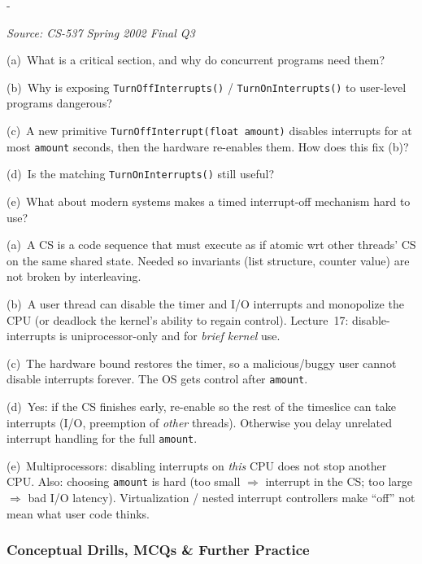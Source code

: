 \documentclass[11pt,a4paper]{article}
\makeatletter
\newcommand{\keepspace}[1]{\par\penalty-100\begingroup
  \setlength{\dimen@}{#1}\dimen@ii\pagegoal\advance\dimen@ii-\pagetotal
  \ifdim\dimen@>\dimen@ii\ifdim\dimen@ii>\z@\vfil\fi\break\fi\endgroup}
\newcounter{qn}[section]
\newenvironment{Qn}[4]{%
  \refstepcounter{qn}\keepspace{7\baselineskip}%
  \begin{tcolorbox}[qboxstyle, title={Q\thesection.\theqn\ \ [#1 \textbar\ #2]\ \ #4}]%
  {\footnotesize\color{g3}\textit{Source: #3}}\par\smallskip%
}{%
  \end{tcolorbox}%
}
\newenvironment{Sol}{%
  \begin{tcolorbox}[sboxstyle, title={Solution}]%
}{%
  \end{tcolorbox}\vspace{0.35em}%
}
\makeatother
\begin{document}
\begin{Qn}{Medium-Hard}{Lect 17}{CS-537 Spring 2002 Final Q3}{Turning interrupts off as a lock}
(a)~What is a critical section, and why do concurrent programs need them?

(b)~Why is exposing \texttt{TurnOffInterrupts()} / \texttt{TurnOnInterrupts()} to user-level programs dangerous?

(c)~A new primitive \texttt{TurnOffInterrupt(float amount)} disables interrupts for at most \texttt{amount} seconds, then the hardware re-enables them. How does this fix (b)?

(d)~Is the matching \texttt{TurnOnInterrupts()} still useful?

(e)~What about modern systems makes a timed interrupt-off mechanism hard to use?
\end{Qn}
\begin{Sol}
(a)~A CS is a code sequence that must execute as if atomic wrt other threads' CS on the same shared state. Needed so invariants (list structure, counter value) are not broken by interleaving.

(b)~A user thread can disable the timer and I/O interrupts and monopolize the CPU (or deadlock the kernel's ability to regain control). Lecture~17: disable-interrupts is uniprocessor-only and for \emph{brief kernel} use.

(c)~The hardware bound restores the timer, so a malicious/buggy user cannot disable interrupts forever. The OS gets control after \texttt{amount}.

(d)~Yes: if the CS finishes early, re-enable so the rest of the timeslice can take interrupts (I/O, preemption of \emph{other} threads). Otherwise you delay unrelated interrupt handling for the full \texttt{amount}.

(e)~Multiprocessors: disabling interrupts on \emph{this} CPU does not stop another CPU. Also: choosing \texttt{amount} is hard (too small $\Rightarrow$ interrupt in the CS; too large $\Rightarrow$ bad I/O latency). Virtualization / nested interrupt controllers make ``off'' not mean what user code thinks.
\end{Sol}

\subsubsection*{Conceptual Drills, MCQs \& Further Practice}
\end{document}

